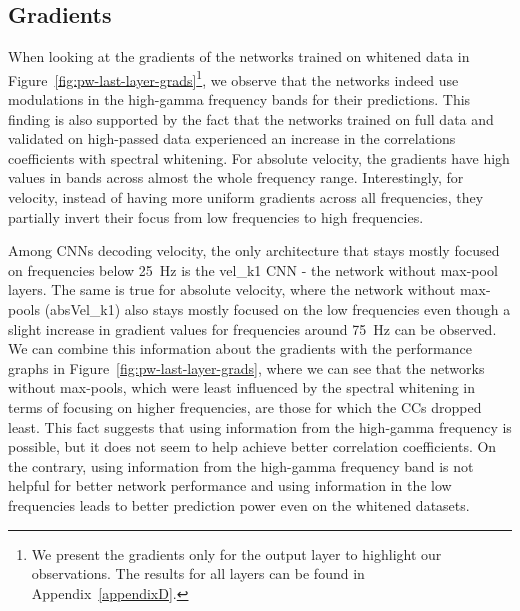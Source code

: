 \subsection{Gradients}\label{subsec:pw-gradients2}
When looking at the gradients of the networks trained on whitened data in Figure~\ref{fig:pw-last-layer-grads}\footnote{We present the gradients only for the output layer to highlight our observations. 
The results for all layers can be found in Appendix~\ref{appendixD}.}, we observe that the networks indeed use modulations in the high-gamma frequency bands for their predictions. 
This finding is also supported by the fact that the networks trained on full data and validated on high-passed data experienced an increase in the correlations coefficients with spectral whitening.
For absolute velocity, the gradients have high values in bands across almost the whole frequency range. Interestingly, for velocity, instead of having more uniform gradients across all frequencies, they partially invert their focus from low frequencies to high frequencies.

Among CNNs decoding velocity, the only architecture that stays mostly focused on frequencies below 25~Hz is the vel\_k1 CNN - the network without max-pool layers.
The same is true for absolute velocity, where the network without max-pools (absVel\_k1) also stays mostly focused on the low frequencies even though a slight increase in gradient values for frequencies around 75~Hz can be observed. 
We can combine this information about the gradients with the performance graphs in Figure~\ref{fig:pw-last-layer-grads}, where we can see that the networks without max-pools, which were least influenced by the spectral whitening in terms of focusing on higher frequencies, are those for which the CCs dropped least.
This fact suggests that using information from the high-gamma frequency is possible, but it does not seem to help achieve better correlation coefficients. 
On the contrary, using information from the high-gamma frequency band is not helpful for better network performance and using information in the low frequencies leads to better prediction power even on the whitened datasets.

